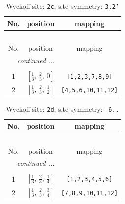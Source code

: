 \documentclass[fleqn,8pt]{jsarticle}
\begin{document}
\renewcommand{\arraystretch}{1.2}
\begin{longtable}{ccc}
\caption{Wyckoff site: {\tt 2c}, site symmetry: {\tt 3.2'}}
 \\
 \hline \hline
No. & position & mapping \\ \hline \endfirsthead

\multicolumn{2}{l}{\tablename\ \thetable{}} \\
 \hline \hline
No. & position & mapping \\ \hline \endhead

 \hline \hline
\multicolumn{2}{r}{\footnotesize\it continued ...} \\ \endfoot

 \hline \hline
\multicolumn{2}{r}{} \\ \endlastfoot

1 & $\left[ \frac{1}{3},\, \frac{2}{3},\, 0 \right]$ & {\tt [1,2,3,7,8,9]} \\ \hline
2 & $\left[ \frac{1}{3},\, \frac{2}{3},\, \frac{1}{2} \right]$ & {\tt [4,5,6,10,11,12]} \\
\end{longtable}
\renewcommand{\arraystretch}{1.2}
\begin{longtable}{ccc}
\caption{Wyckoff site: {\tt 2d}, site symmetry: {\tt -6..}}
 \\
 \hline \hline
No. & position & mapping \\ \hline \endfirsthead

\multicolumn{2}{l}{\tablename\ \thetable{}} \\
 \hline \hline
No. & position & mapping \\ \hline \endhead

 \hline \hline
\multicolumn{2}{r}{\footnotesize\it continued ...} \\ \endfoot

 \hline \hline
\multicolumn{2}{r}{} \\ \endlastfoot

1 & $\left[ \frac{1}{3},\, \frac{2}{3},\, \frac{1}{4} \right]$ & {\tt [1,2,3,4,5,6]} \\ \hline
2 & $\left[ \frac{1}{3},\, \frac{2}{3},\, \frac{3}{4} \right]$ & {\tt [7,8,9,10,11,12]} \\
\end{longtable}
\renewcommand{\arraystretch}{1.2}
\end{document}
